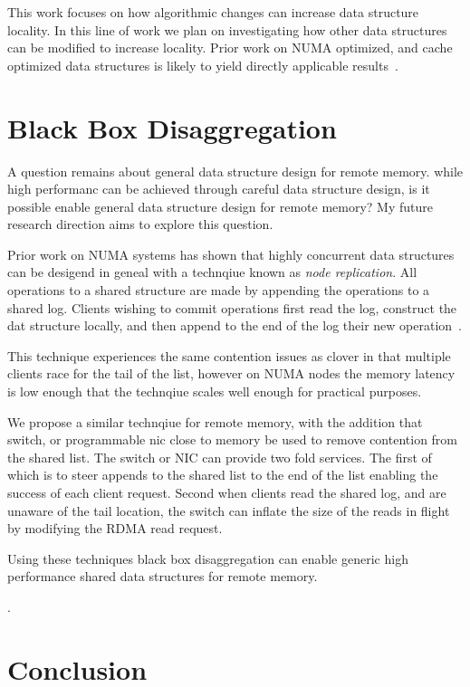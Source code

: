 This work focuses on how algorithmic changes can increase
data structure locality. In this line of work we plan on
investigating how other data structures can be modified to
increase locality. Prior work on NUMA optimized, and cache
optimized data structures is likely to yield directly
applicable results~\cite{hopscotch}.

\section{Black Box Disaggregation}

A question remains about general data structure design for
remote memory. while high performanc can be achieved through
careful data structure design, is it possible enable general
data structure design for remote memory? My future research
direction aims to explore this question.

Prior work on NUMA systems has shown that highly concurrent
data structures can be desigend in geneal with a technqiue
known as \textit{node replication}. All operations to a
shared structure are made by appending the operations to a
shared log. Clients wishing to commit operations first read
the log, construct the dat structure locally, and then
append to the end of the log their new operation~\cite{bbd}.

This technique experiences the same contention issues as
clover in that multiple clients race for the tail of the
list, however on NUMA nodes the memory latency is low enough
that the technqiue scales well enough for practical
purposes. 

We propose a similar technqiue for remote memory, with the
addition that switch, or programmable nic close to memory be
used to remove contention from the shared list. The switch
or NIC can provide two fold services. The first of which is
to steer appends to the shared list to the end of the list
enabling the success of each client request. Second when
clients read the shared log, and are unaware of the tail
location, the switch can inflate the size of the reads in
flight by modifying the RDMA read request. 

Using these techniques black box disaggregation can enable
generic high performance shared data structures for remote
memory.

.

\section{Conclusion}
